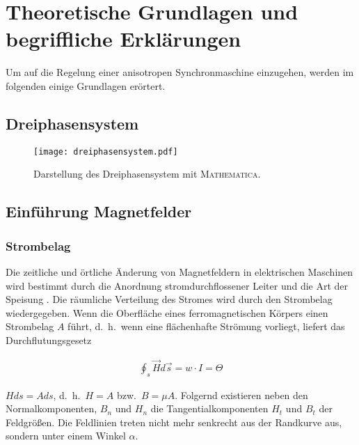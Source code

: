 
\chapter{Theoretische Grundlagen und begriffliche Erklärungen}\label{cha:grundlagen}

Um auf die Regelung einer anisotropen Synchronmaschine einzugehen, werden im folgenden einige Grundlagen erörtert.

\section{Dreiphasensystem}\label{sec:dreiphasensystem}

\begin{figure}[h]
\centering
\texttt{[image: dreiphasensystem.pdf]}
\label{fig:dreiphasensystem}
\caption{Darstellung des Dreiphasensystem mit \textsc{Mathematica}.}
\end{figure}

\section{Einführung Magnetfelder}\label{sec:magnetfelder}

\subsection{Strombelag}\label{sec:strombelag}

Die zeitliche und örtliche Änderung von Magnetfeldern in elektrischen Maschinen wird bestimmt durch die Anordnung stromdurchflossener Leiter und die Art der Speisung \parencite[S.~199]{hofmann2013}.
Die räumliche Verteilung des Stromes wird durch den Strombelag wiedergegeben.
Wenn die Oberfläche eines ferromagnetischen Körpers einen Strombelag $A$ führt, d.\ h.\ wenn eine flächenhafte Strömung vorliegt, liefert das Durchflutungsgesetz

\begin{align}
\oint_{s}{\vec{H}d\vec{s}} = w\cdot I = \Theta \label{durchflutungsgesetz}
\end{align}

$Hds=Ads$, d.\ h.\ $H = A$ bzw.\ $B = \mu A$.
Folgernd existieren neben den Normalkomponenten, $B_n$ und $H_n$ die Tangentialkomponenten $H_t$ und $B_t$ der Feldgrößen.
Die Feldlinien treten nicht mehr senkrecht aus der Randkurve aus, sondern unter einem Winkel $\alpha$.

